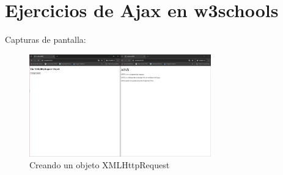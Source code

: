 \section{Ejercicios de Ajax en w3schools}

Capturas de pantalla:

\begin{figure}[H]
    \centering
    \includegraphics[width=0.7\textwidth]{img/ex1.jpg}
    \caption{Creando un objeto XMLHttpRequest}
    \end{figure}


